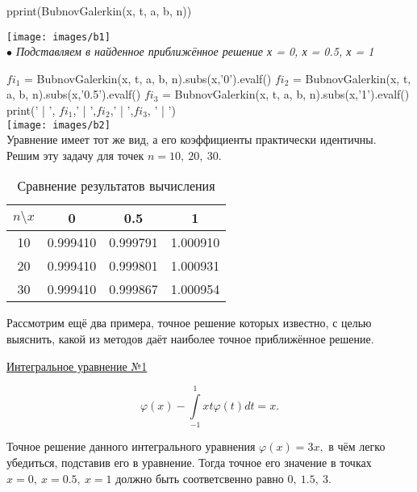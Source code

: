\documentclass[12pt]{article}
\begin{document}
pprint(BubnovGalerkin(x, t, a, b, n)) \vskip 0.3cm

\texttt{[image: images/b1]}  \\

\textit{$ \bullet $                     Подставляем в найденное приближённое решение х = 0, х = 0.5, х = 1} \vskip 0.3cm

$ fi_1 $ = BubnovGalerkin(x, t, a, b, n).subs(x,'0').evalf() \vskip 0.3cm
$ fi_2 $ = BubnovGalerkin(x, t, a, b, n).subs(x,'0.5').evalf() \vskip 0.3cm
$ fi_3 $ = BubnovGalerkin(x, t, a, b, n).subs(x,'1').evalf() \vskip 0.3cm
print(' | ', $ fi_1 $,' | ',$ fi_2 $,' | ',$ fi_3 $, ' | ') \\

\texttt{[image: images/b2]}  \\

Уравнение имеет тот же вид, а его коэффициенты практически идентичны. Решим эту задачу для точек $ n = 10, \: 20, \: 30 $.\\

\renewcommand{\arraystretch}{1.8} %
\renewcommand{\tabcolsep}{0.5cm}   %
\begin{table}[h!]
	\caption{\label{tab:canonsummary} Сравнение результатов вычисления}
	\begin{center}
		\begin{tabular}{|c|c|c|c|}
			\hline
			$ n \setminus x $ & 0 & 0.5 & 1\\
			\hline
			10 & 0.999410 & 0.999791 & 1.000910 \\
			\hline
			20 & 0.999410 & 0.999801 & 1.000931 \\
			\hline
			30 & 0.999410 & 0.999867 & 1.000954 \\
			\hline
		\end{tabular}
	\end{center}
\end{table} 

\newpage

Рассмотрим ещё два примера, точное решение которых известно, с целью выяснить, какой из методов даёт наиболее точное приближённое решение.\\
\begin{center}
	\underline{Интегральное уравнение №1}
\end{center}

$$\varphi(x) - \int\limits_{-1}^{1} xt\varphi(t)dt = x.$$

Точное решение данного интегрального уравнения $ \varphi(x) = 3x ,$ в чём легко убедиться, подставив его в уравнение. Тогда точное его значение в точках $ x = 0, \: x = 0.5, \: x = 1 $ должно быть соответсвенно равно $ 0, \: 1.5, \:  3. $\\
\end{document}
